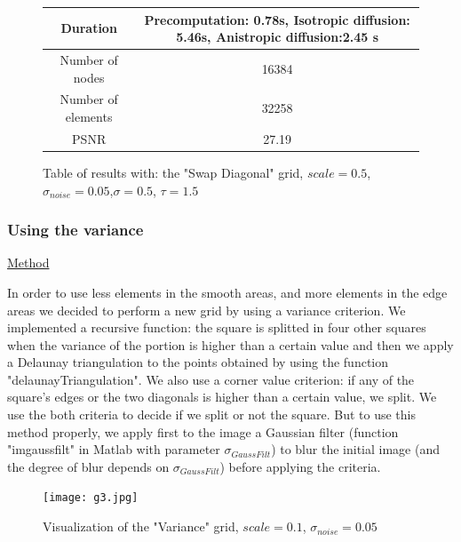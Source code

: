\documentclass{report}
\begin{document}
        \begin{figure}[h!]
        \centering
         \caption{Table of results with: the "Swap Diagonal" grid, $scale=0.5$, $\sigma_{noise}=0.05$,$\sigma=0.5$, $\tau=1.5$}
        \label{T3}
        \begin{tabular}{|c|c|}
          \hline
         Duration &  Precomputation: 0.78s,
         Isotropic diffusion: 5.46s,
         Anistropic diffusion:2.45 s   \\
        \hline
         Number of nodes & 16384 \\
         \hline
         Number of elements & 32258\\
 
         \hline
         PSNR & 27.19 \\
         \hline
        \end{tabular}
        \end{figure}







\subsubsection{Using the variance}
\underline{Method}


In order to use less elements in the smooth areas, and more elements in the edge areas we decided to perform a new grid by using a variance criterion. We implemented a recursive function: the square is splitted in four other squares when the variance of the portion is higher than a certain value and then we apply a Delaunay triangulation to the points obtained by using the function "delaunayTriangulation". We also use a corner value criterion: if any of the square's edges or the two diagonals is higher than a certain value, we split. We use the both criteria to decide if we split or not the square.  But to use this method properly, we apply first to the image a Gaussian filter (function "imgaussfilt" in Matlab with parameter $\sigma_{GaussFilt}$) to blur the initial image (and the degree of blur depends on $\sigma_{GaussFilt}$) before applying the criteria.  \\







        \begin{figure}
        \label{g3}
        \centering
        \caption{Visualization of the "Variance" grid, $scale=0.1$, $\sigma_{noise}=0.05$}
        \texttt{[image: g3.jpg]}
        \end{figure}
        
\end{document}
